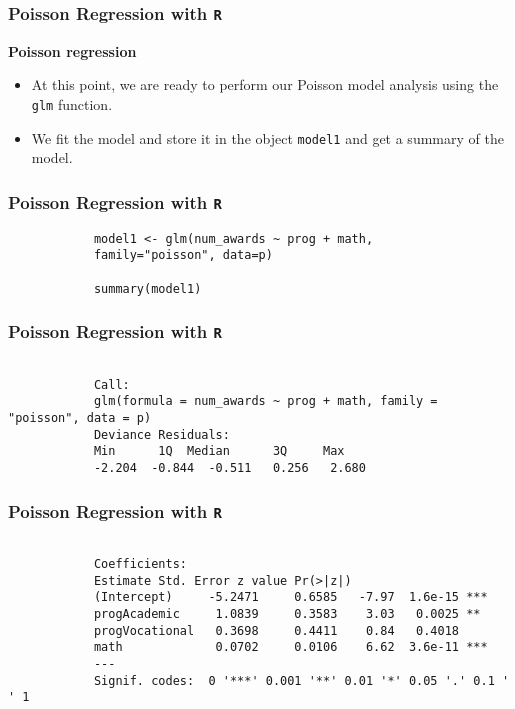 \documentclass[00-GLMregslides.tex]{subfiles}
\begin{document}
	
	\begin{frame}[fragile]
		
		\frametitle{Poisson Regression with \texttt{R}}
		\Large
		
		\textbf{Poisson regression}
		\begin{itemize}
			\item At this point, we are ready to perform our Poisson model analysis using the \texttt{glm} function. 
			\item We fit the model and store it in the object \texttt{model1} and get a summary of the model.
		\end{itemize}
	\end{frame}
	
	\begin{frame}[fragile]
		
		\frametitle{Poisson Regression with \texttt{R}}
		\large
		\begin{framed}
			\begin{verbatim}
			model1 <- glm(num_awards ~ prog + math, 
			family="poisson", data=p)
			
			summary(model1)
			\end{verbatim}
		\end{framed}
	\end{frame}
	\begin{frame}[fragile]
		\frametitle{Poisson Regression with \texttt{R}}
		\large
		\begin{framed}
			\begin{verbatim}
			
			Call:
			glm(formula = num_awards ~ prog + math, family = "poisson", data = p)
			Deviance Residuals: 
			Min      1Q  Median      3Q     Max  
			-2.204  -0.844  -0.511   0.256   2.680  
			\end{verbatim}
		\end{framed}
	\end{frame}
	
	\begin{frame}[fragile]
		
		\frametitle{Poisson Regression with \texttt{R}}
		\large
		\begin{framed}
			\begin{verbatim}
			
			Coefficients:
			Estimate Std. Error z value Pr(>|z|)    
			(Intercept)     -5.2471     0.6585   -7.97  1.6e-15 ***
			progAcademic     1.0839     0.3583    3.03   0.0025 ** 
			progVocational   0.3698     0.4411    0.84   0.4018    
			math             0.0702     0.0106    6.62  3.6e-11 ***
			---
			Signif. codes:  0 '***' 0.001 '**' 0.01 '*' 0.05 '.' 0.1 ' ' 1
			
			\end{verbatim}
		\end{framed}
	\end{frame}
	
\end{document}
